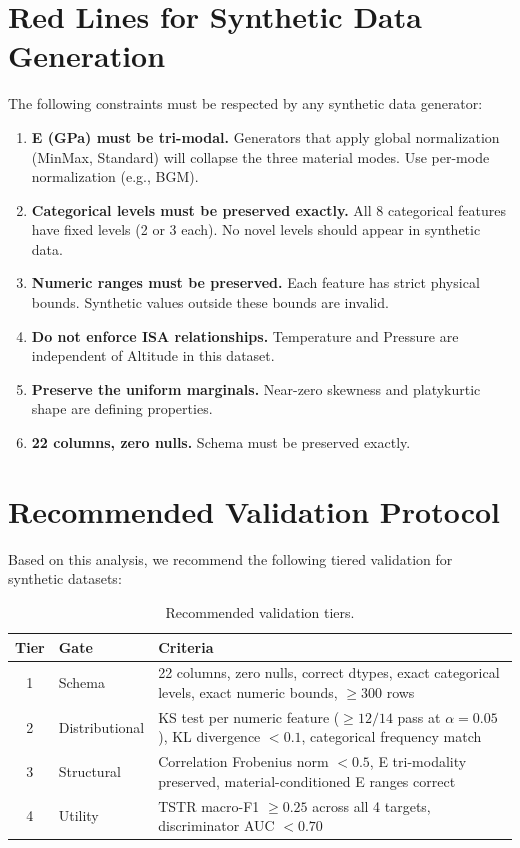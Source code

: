 \documentclass[11pt, a4paper]{report}
\begin{document}
\section{Red Lines for Synthetic Data Generation}

\begin{warningbox}
The following constraints must be respected by any synthetic data generator:
\begin{enumerate}[nosep]
\item \textbf{E (GPa) must be tri-modal.} Generators that apply global normalization (MinMax, Standard) will collapse the three material modes. Use per-mode normalization (e.g., BGM).
\item \textbf{Categorical levels must be preserved exactly.} All 8 categorical features have fixed levels (2 or 3 each). No novel levels should appear in synthetic data.
\item \textbf{Numeric ranges must be preserved.} Each feature has strict physical bounds. Synthetic values outside these bounds are invalid.
\item \textbf{Do not enforce ISA relationships.} Temperature and Pressure are independent of Altitude in this dataset.
\item \textbf{Preserve the uniform marginals.} Near-zero skewness and platykurtic shape are defining properties.
\item \textbf{22 columns, zero nulls.} Schema must be preserved exactly.
\end{enumerate}
\end{warningbox}

\section{Recommended Validation Protocol}

Based on this analysis, we recommend the following tiered validation for synthetic datasets:

\begin{table}[H]
\centering
\caption{Recommended validation tiers.}
\begin{tabular}{clp{8cm}}
\toprule
\textbf{Tier} & \textbf{Gate} & \textbf{Criteria} \\
\midrule
1 & Schema & 22 columns, zero nulls, correct dtypes, exact categorical levels, exact numeric bounds, $\geq 300$ rows \\
2 & Distributional & KS test per numeric feature ($\geq 12/14$ pass at $\alpha=0.05$), KL divergence $< 0.1$, categorical frequency match \\
3 & Structural & Correlation Frobenius norm $< 0.5$, E tri-modality preserved, material-conditioned E ranges correct \\
4 & Utility & TSTR macro-F1 $\geq 0.25$ across all 4 targets, discriminator AUC $< 0.70$ \\
\bottomrule
\end{tabular}
\end{table}
\end{document}
